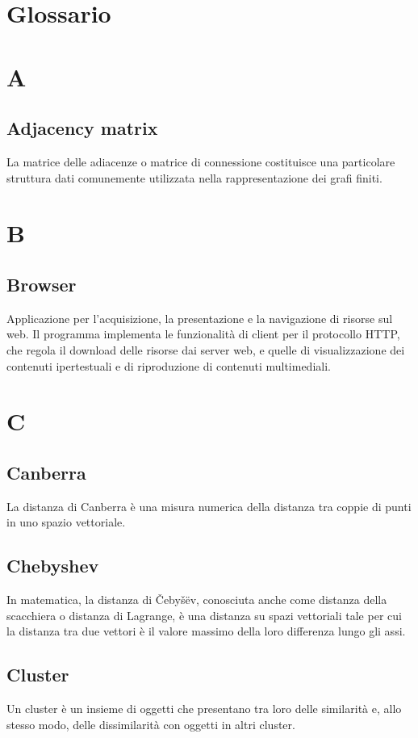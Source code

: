 \appendix
\section{Glossario}
\section*{A}

\subsection*{Adjacency matrix}
La matrice delle adiacenze o matrice di connessione costituisce una particolare struttura dati comunemente utilizzata nella rappresentazione dei grafi finiti.

\section*{B}

\subsection*{Browser}
Applicazione per l'acquisizione, la presentazione e la navigazione di risorse sul web.
Il programma implementa le funzionalità di client per il protocollo HTTP, che regola il download delle risorse dai server web, e quelle di visualizzazione dei contenuti ipertestuali e di riproduzione di contenuti multimediali.

\section*{C}

\subsection*{Canberra}
La distanza di Canberra è una misura numerica della distanza tra coppie di punti in uno spazio vettoriale.

\subsection*{Chebyshev}
In matematica, la distanza di Čebyšëv, conosciuta anche come distanza della scacchiera o distanza di Lagrange, è una distanza su spazi vettoriali tale per cui la distanza tra due vettori è il valore massimo della loro differenza lungo gli assi.

\subsection*{Cluster}
Un cluster è un insieme di oggetti che presentano tra loro delle similarità e, allo stesso modo, delle dissimilarità con oggetti in altri cluster.
	
